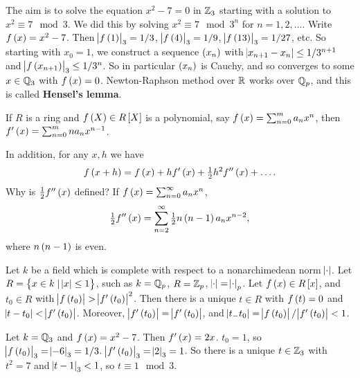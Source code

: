 The aim is to solve the equation $ x^2 - 7 = 0 $ in $ \mathbb{Z}_3 $ starting with a solution to $ x^2 \equiv 7 \mod 3 $. We did this by solving $ x^2 \equiv 7 \mod 3^n $ for $ n = 1, 2, \dots $. Write $ f\br{x} = x^2 - 7 $. Then $ \abs{f\br{1}}_3 = 1 / 3 $, $ \abs{f\br{4}}_3 = 1 / 9 $, $ \abs{f\br{13}}_3 = 1 / 27 $, etc. So starting with $ x_0 = 1 $, we construct a sequence $ \br{x_n} $ with $ \abs{x_{n + 1} - x_n} \le 1 / 3^{n + 1} $ and $ \abs{f\br{x_{n + 1}}}_3 \le 1 / 3^n $. So in particular $ \br{x_n} $ is Cauchy, and so converges to some $ x \in \mathbb{Q}_3 $ with $ f\br{x} = 0 $. Newton-Raphson method over $ \mathbb{R} $ works over $ \mathbb{Q}_p $, and this is called \textbf{Hensel's lemma}.

\begin{definition}
If $ R $ is a ring and $ f\br{X} \in R\sbr{X} $ is a polynomial, say $ f\br{x} = \sum_{n = 0}^m a_nx^n $, then $ f'\br{x} = \sum_{n = 0}^m na_nx^{n - 1} $.
\end{definition}

In addition, for any $ x, h $ we have
$$ f\br{x + h} = f\br{x} + hf'\br{x} + \tfrac{1}{2}h^2f''\br{x} + \dots. $$
Why is $ \tfrac{1}{2}f''\br{x} $ defined? If $ f\br{x} = \sum_{n = 0}^\infty a_nx^n $,
$$ \tfrac{1}{2}f''\br{x} = \sum_{n = 2}^\infty \tfrac{1}{2}n\br{n - 1}a_nx^{n - 2}, $$
where $ n\br{n - 1} $ is even.

\begin{theorem}
Let $ k $ be a field which is complete with respect to a nonarchimedean norm $ \abs{\cdot} $. Let $ R = \cbr{x \in k \mid \abs{x} \le 1} $, such as $ k = \mathbb{Q}_p $, $ R = \mathbb{Z}_p $, $ \abs{\cdot} = \abs{\cdot}_p $. Let $ f\br{x} \in R\sbr{x} $, and $ t_0 \in R $ with $ \abs{f\br{t_0}} > \abs{f'\br{t_0}}^2 $. Then there is a unique $ t \in R $ with $ f\br{t} = 0 $ and $ \abs{t - t_0} < \abs{f'\br{t_0}} $. Moreover, $ \abs{f'\br{t_0}} = \abs{f'\br{t_0}} $, and $ \abs{t_- t_0} = \abs{f\br{t_0}} / \abs{f'\br{t_0}} < 1 $.
\end{theorem}

\begin{example*}
Let $ k = \mathbb{Q}_3 $ and $ f\br{x} = x^2 - 7 $. Then $ f'\br{x} = 2x $. $ t_0 = 1 $, so $ \abs{f\br{t_0}}_3 = \abs{-6}_3 = 1/ 3 $. $ \abs{f'\br{t_0}}_3 = \abs{2}_3 = 1 $. So there is a unique $ t \in \mathbb{Z}_3 $ with $ t^2 = 7 $ and $ \abs{t - 1}_3 < 1 $, so $ t \equiv 1 \mod 3 $.
\end{example*}

